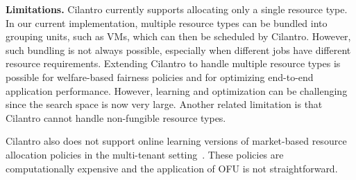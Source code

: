 


\textbf{Limitations.}
Cilantro currently supports allocating only a single resource type. In our current implementation,
multiple resource types can be bundled into grouping units, such as VMs, which can then be scheduled
by Cilantro. However, such bundling is not always possible, especially when different jobs have
different resource requirements.
Extending Cilantro to handle multiple resource types is possible for welfare-based
fairness policies\cite{ghodsi2011dominant} and for optimizing end-to-end application performance.
However, learning and optimization can be challenging since the search space is now very large.
Another related limitation is that Cilantro cannot handle non-fungible resource types.
% 

Cilantro also does not support online learning versions of market-based resource allocation
policies in the multi-tenant setting~\citep{zahedi2018amdahl,lai2005tycoon,varian1973equity}.
These policies are computationally expensive and the application of OFU
is not straightforward. 



